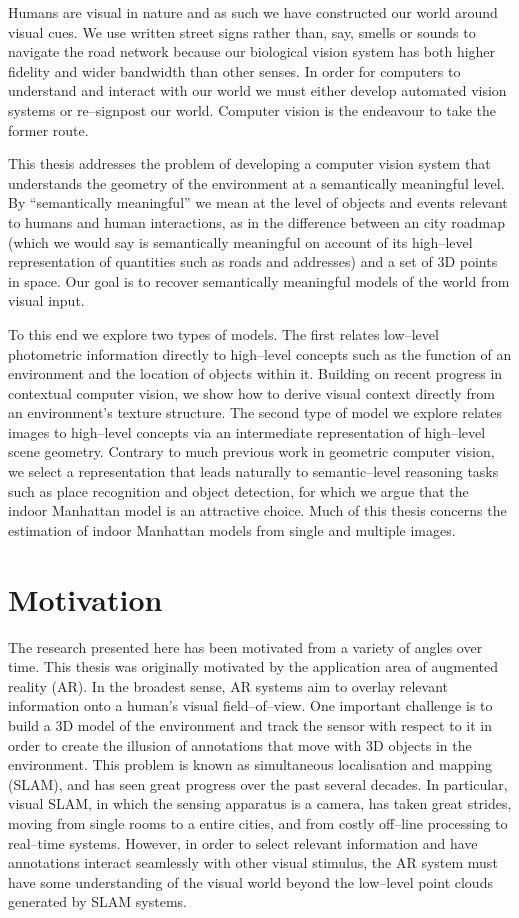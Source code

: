 Humans are visual in nature and as such we have constructed our world
around visual cues. We use written street signs rather than, say,
smells or sounds to navigate the road network because our biological
vision system has both higher fidelity and wider bandwidth than other
senses. In order for computers to understand and interact with our
world we must either develop automated vision systems or re--signpost
our world. Computer vision is the endeavour to take the former route.

This thesis addresses the problem of developing a computer vision
system that understands the geometry of the environment at a
semantically meaningful level. By ``semantically meaningful'' we mean
at the level of objects and events relevant to humans and human
interactions, as in the difference between an city roadmap (which we
would say is semantically meaningful on account of its high--level
representation of quantities such as roads and addresses) and a set of
3D points in space. Our goal is to recover semantically meaningful models
of the world from visual input.

To this end we explore two types of models. The first relates
low--level photometric information directly to high--level concepts
such as the function of an environment and the location of objects
within it. Building on recent progress in contextual computer vision,
we show how to derive visual context directly from an environment's
texture structure. The second type of model we explore relates images
to high--level concepts via an intermediate representation of
high--level scene geometry. Contrary to much previous work in
geometric computer vision, we select a representation that leads
naturally to semantic--level reasoning tasks such as place recognition
and object detection, for which we argue that the indoor Manhattan
model is an attractive choice. Much of this thesis concerns the
estimation of indoor Manhattan models from single and multiple images.

\section{Motivation}

The research presented here has been motivated from a variety of
angles over time. This thesis was originally motivated by the
application area of augmented reality (AR). In the broadest sense, AR
systems aim to overlay relevant information onto a human's visual
field--of--view. One important challenge is to build a 3D model of the
environment and track the sensor with respect to it in order to create
the illusion of annotations that move with 3D objects in the
environment. This problem is known as simultaneous localisation and
mapping (SLAM), and has seen great progress over the past several
decades. In particular, visual SLAM, in which the sensing apparatus is
a camera, has taken great strides, moving from single rooms to a
entire cities, and from costly off--line processing to real--time
systems. However, in order to select relevant information and have
annotations interact seamlessly with other visual stimulus, the AR
system must have some understanding of the visual world beyond the
low--level point clouds generated by SLAM systems.

